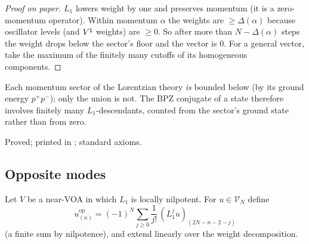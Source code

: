 \begin{proof}[Proof on paper]
$L_1$ lowers weight by one and preserves momentum (it is a zero-momentum operator).  Within momentum $\alpha$ the weights
are $\ge \Delta(\alpha)$ because oscillator levels (and ${V^{\natural}}$ weights) are $\ge0$.  So after more than $N-\Delta(\alpha)$ steps the weight
drops below the sector's floor and the vector is $0$.  For a general vector, take the maximum of the finitely many
cutoffs of its homogeneous components.
\end{proof}

\begin{physics}
Each momentum sector of the Lorentzian theory \emph{is} bounded below (by its ground energy $p^+p^-$); only the union is
not.  The BPZ conjugate of a state therefore involves finitely many $L_1$-descendants, counted from the sector's ground
state rather than from zero.
\end{physics}

\begin{status}
Proved; printed in ; standard axioms.
\end{status}

\subsection{Opposite modes}

\begin{definition}\label{ch17:def:opposite}
Let $V$ be a near-VOA in which $L_1$ is locally nilpotent.  For $u\in\mathcal V_N$ define
\begin{equation*}
  u^{\mathrm{op}}_{(n)}=(-1)^N\sum_{j\ge0}\frac1{j!}\,(L_1^ju)_{(2N-n-2-j)}
\end{equation*}
(a finite sum by nilpotence), and extend linearly over the weight decomposition.
\end{definition}

